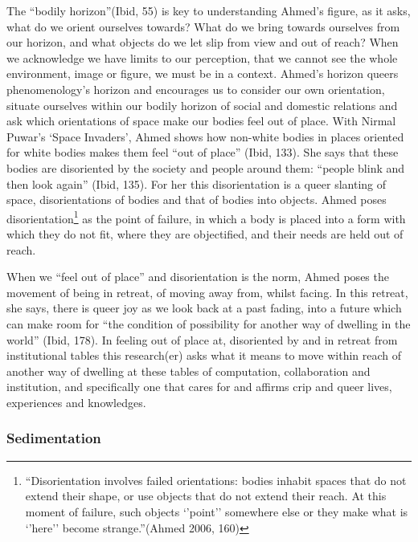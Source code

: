 The ``bodily horizon''(Ibid, 55) is key to understanding Ahmed's figure,
as it asks, what do we orient ourselves towards? What do we bring
towards ourselves from our horizon, and what objects do we let slip from
view and out of reach? When we acknowledge we have limits to our
perception, that we cannot see the whole environment, image or figure,
we must be in a context. Ahmed's horizon queers phenomenology's horizon
and encourages us to consider our own orientation, situate ourselves
within our bodily horizon of social and domestic relations and ask which
orientations of space make our bodies feel out of place. With Nirmal
Puwar's `Space Invaders', Ahmed shows how non-white bodies in places
oriented for white bodies makes them feel ``out of place'' (Ibid, 133).
She says that these bodies are disoriented by the society and people
around them: ``people blink and then look again'' (Ibid, 135). For her
this disorientation is a queer slanting of space, disorientations of
bodies and that of bodies into objects. Ahmed poses
disorientation\footnote{``Disorientation involves failed orientations:
  bodies inhabit spaces that do not extend their shape, or use objects
  that do not extend their reach. At this moment of failure, such
  objects `'point'' somewhere else or they make what is `'here'' become
  strange.''(Ahmed 2006, 160)} as the point of failure, in which a body
is placed into a form with which they do not fit, where they are
objectified, and their needs are held out of reach.

When we ``feel out of place'' and disorientation is the norm, Ahmed
poses the movement of being in retreat, of moving away from, whilst
facing. In this retreat, she says, there is queer joy as we look back at
a past fading, into a future which can make room for ``the condition of
possibility for another way of dwelling in the world'' (Ibid, 178). In
feeling out of place at, disoriented by and in retreat from
institutional tables this research(er) asks what it means to move within
reach of another way of dwelling at these tables of computation,
collaboration and institution, and specifically one that cares for and
affirms crip and queer lives, experiences and knowledges.

\hypertarget{sedimentation}{%
\subsubsection{Sedimentation}\label{sedimentation}}

